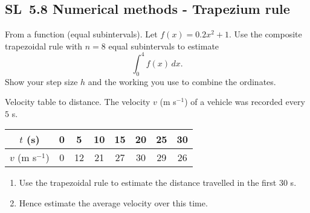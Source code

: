 \documentclass[11pt]{article}
\def\textbf#1{#1}%
\newcommand{\tocsubsection}[1]{\subsection{#1}}
\newcounter{question}
\begin{document}
\tocsubsection{SL 5.8 \; Numerical methods - Trapezium rule}


\begin{question}
\textbf{From a function (equal subintervals).}
Let \(f(x)=0.2x^{2}+1\). Use the composite trapezoidal rule with \(n=8\) equal subintervals to estimate
\[
\int_{0}^{4} f(x)\,dx .
\]
Show your step size \(h\) and the working you use to combine the ordinates.

\begin{center}
\end{center}
\end{question}

\begin{question}
\textbf{Velocity table to distance.}
The velocity \(v\) (m s\(^{-1}\)) of a vehicle was recorded every \(5\) s.

\begin{center}
\begin{tabular}{c|ccccccc}
\(t\) (s) & 0 & 5 & 10 & 15 & 20 & 25 & 30\\\hline
\(v\) (m s\(^{-1}\)) & 0 & 12 & 21 & 27 & 30 & 29 & 26
\end{tabular}
\end{center}

\begin{enumerate}
  \item Use the trapezoidal rule to estimate the distance travelled in the first \(30\) s.
  \item Hence estimate the average velocity over this time.
\end{enumerate}
\end{question}
\end{document}
